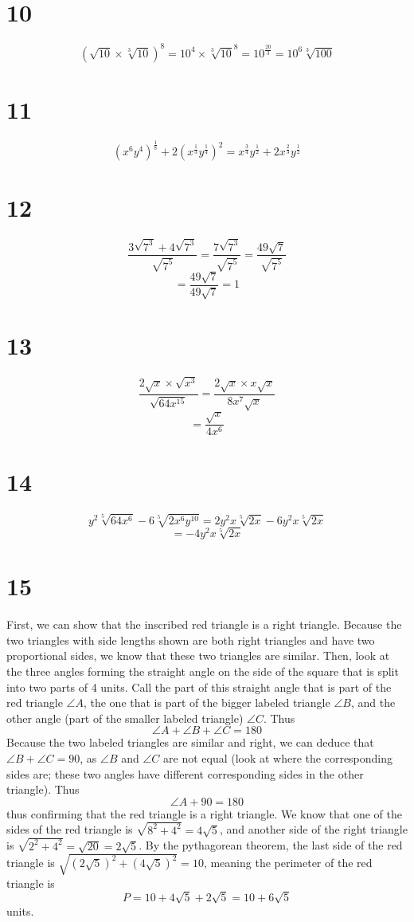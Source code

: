 \documentclass{article}
\theoremstyle{definition}
\begin{document}
\section*{10}
\[ (\sqrt{10}\times \sqrt[3]{10})^8=10^4\times \sqrt[3]{10}^8=10^\frac{20}{3}=10^6\sqrt[3]{100} \]

\section*{11}
\[ (x^6y^4)^\frac{1}{8}+2(x^\frac{1}{3}y^\frac{1}{4})^2=x^\frac{3}{4}y^\frac{1}{2}+2x^\frac{2}{3}y^\frac{1}{2} \]

\section*{12}
\[ \frac{3\sqrt{7^3}+4\sqrt{7^3}}{\sqrt{7^5}}=\frac{7\sqrt{7^3}}{\sqrt{7^5}}=\frac{49\sqrt{7}}{\sqrt{7^5}} \]
\[ =\frac{49\sqrt{7}}{49\sqrt{7}}=1 \]

\section*{13}
\[ \frac{2\sqrt{x}\times\sqrt{x^3}}{\sqrt{64x^{15}}}=\frac{2\sqrt{x}\times x\sqrt{x}}{8x^7\sqrt{x}} \]
\[ =\frac{\sqrt{x}}{4x^6} \]

\section*{14}
\[ y^2\sqrt[5]{64x^6}-6\sqrt[5]{2x^6y^{10}}=2y^2x\sqrt[5]{2x}-6y^2x\sqrt[5]{2x} \]
\[ =-4y^2x\sqrt[5]{2x} \]

\section*{15} 
First, we can show that the inscribed red triangle is a right triangle. Because the two triangles with side lengths shown are both right triangles 
and have two proportional sides, we know that these two triangles are similar. Then, look at the three angles forming the straight angle on the side of 
the square that is split into two parts of 4 units. Call the part of this straight angle that is part of the red triangle $\angle{A}$, the one that is 
part of the bigger labeled triangle $\angle{B}$, and the other angle (part of the smaller labeled triangle) $\angle{C}$. Thus 
\[ \angle{A}+\angle{B}+\angle{C}=180 \] Because the two labeled triangles are similar and right, we can deduce that $\angle{B}+\angle{C}=90$, as 
$\angle{B}$ and $\angle{C}$ are not equal (look at where the corresponding sides are; these two angles have different corresponding sides in the other 
triangle). Thus \[ \angle{A}+90=180 \] thus confirming that the red triangle is a right triangle. 
We know that one of the sides of the red triangle is $\sqrt{8^2+4^2}=4\sqrt{5}$, and another side of the right triangle is 
$\sqrt{2^2+4^2}=\sqrt{20}=2\sqrt{5}$. By the pythagorean theorem, the last side of the red triangle is 
$\sqrt{(2\sqrt{5})^2+(4\sqrt{5})^2}=10$, meaning the perimeter of the red triangle is 
\[ P=10+4\sqrt{5}+2\sqrt{5}=10+6\sqrt{5} \] units.
\end{document}
